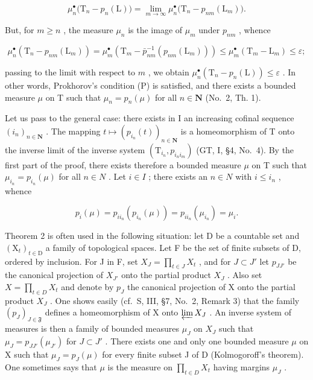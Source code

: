 \[
\mu_ {n} ^ {\bullet} \big (\mathrm{T} _ {n} - p _ {n} (\mathrm{L}) \big) = \lim _ {m \rightarrow \infty} \mu_ {n} ^ {\bullet} \big (\mathrm{T} _ {n} - p _ {n m} (\mathrm{L} _ {m}) \big).
\]

But, for \(m \geqslant n\) , the measure \(\mu_{n}\) is the image of \(\mu_{m}\) under \(p_{nm}\) , whence

\[
\mu_ {n} ^ {\bullet} \left(\mathrm{T} _ {n} - p _ {n m} (\mathrm{L} _ {m})\right) = \mu_ {m} ^ {\bullet} \left(\mathrm{T} _ {m} - \bar {p} _ {n m} ^ {- 1} (p _ {n m} (\mathrm{L} _ {m}))\right) \leqslant \mu_ {m} ^ {\bullet} \left(\mathrm{T} _ {m} - \mathrm{L} _ {m}\right) \leqslant \varepsilon ;
\]

passing to the limit with respect to \(m\) , we obtain \(\mu_n^\bullet (\mathrm{T}_n - p_n(\mathrm{L})) \leqslant \varepsilon\) . In other words, Prokhorov's condition (P) is satisfied, and there exists a bounded measure \(\mu\) on T such that \(\mu_n = p_n(\mu)\) for all \(n \in \mathbf{N}\) (No.~2, Th. 1).

Let us pass to the general case: there exists in I an increasing cofinal sequence \((i_{n})_{n\in\mathbf{N}}\) . The mapping \(t\mapsto\left(p_{i_{n}}(t)\right)_{n\in\mathbf{N}}\) is a homeomorphism of T onto the inverse limit of the inverse system \((\mathrm{T}_{i_{n}},p_{i_{n}i_{m}})\) (GT, I, §4, No.~4). By the first part of the proof, there exists therefore a bounded measure \(\mu\) on T such that \(\mu_{i_{n}}=p_{i_{n}}(\mu)\) for all \(n\in N\) . Let \(i\in I\) ; there exists an \(n\in N\) with \(i\leqslant i_{n}\) , whence

\[
p _ {i} (\mu) = p _ {i i _ {n}} \left(p _ {i _ {n}} (\mu)\right) = p _ {i i _ {n}} \left(\mu_ {i _ {n}}\right) = \mu_ {i}.\tag{Q.E.D.}
\]

Theorem 2 is often used in the following situation: let D be a countable set and \((\mathrm{X}_{t})_{t\in\mathrm{D}}\) a family of topological spaces. Let F be the set of finite subsets of D, ordered by inclusion. For J in F, set \(X_{J}=\prod_{t\in J}X_{t}\) , and for \(J\subset J'\) let \(p_{JJ'}\) be the canonical projection of \(X_{J'}\) onto the partial product \(X_{J}\) . Also set \(X=\prod_{t\in D}X_{t}\) and denote by \(p_{J}\) the canonical projection of X onto the partial product \(X_{J}\) . One shows easily (cf.~S, III, §7, No.~2, Remark 3) that the family \((p_{J})_{J\in\mathfrak{F}}\) defines a homeomorphism of X onto \(\varprojlim X_{J}\) . An inverse system of measures is then a family of bounded measures \(\mu_{J}\) on \(X_{J}\) such that \(\mu_{J}=p_{JJ'}(\mu_{J'})\) for \(J\subset J'\) . There exists one and only one bounded measure \(\mu\) on X such that \(\mu_{J}=p_{J}(\mu)\) for every finite subset J of D (Kolmogoroff's theorem). One sometimes says that \(\mu\) is the measure on \(\prod_{t\in D}X_{t}\) having margins \(\mu_{J}\) .

